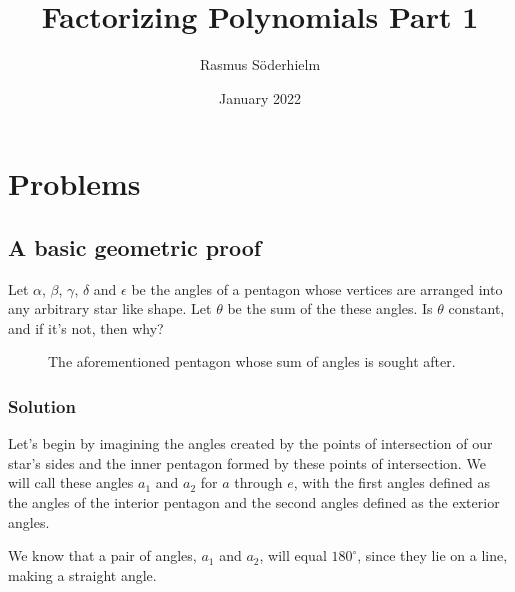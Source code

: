 \documentclass{article}
\title{Factorizing Polynomials Part 1}
\author{Rasmus Söderhielm}
\date{January 2022}
\newcommand{\solution}{\subsubsection*{\textcolor{MainColor}{Solution}}}
\theoremstyle{maintheorem}
\begin{document}
\linespread{1.5}\selectfont

\maketitle

\section*{\color{MainColor}Problems} \label{Problems}
\subsection{
    A basic geometric proof
}
Let $\alpha$, $\beta$, $\gamma$, $\delta$ and $\epsilon$ be the angles of a pentagon
whose vertices are arranged into any arbitrary star like shape.
Let $\theta$ be the sum of the these angles.
Is $\theta$ constant, and if it's not, then why?

\begin{figure}[h]\label{star}
    \centering

    \caption{The aforementioned pentagon whose sum of angles is sought after.}
\end{figure}

\solution

Let's begin by imagining the angles created by the points of intersection of our star's sides
and the inner pentagon formed by these points of intersection.
We will call these angles $a_1$ and $a_2$ for $a$ through $e$,
with the first angles defined as the angles of the interior pentagon and the second angles defined as the exterior angles.

We know that a pair of angles, $a_1$ and $a_2$, will equal $180^\circ$, since they lie on a line, making a straight angle.
\end{document}
